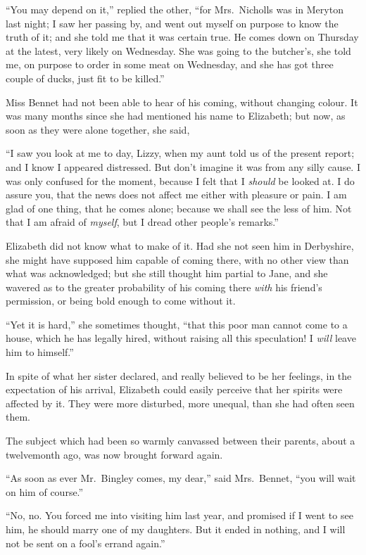 “You may depend on it,” replied the other, “for
Mrs.\ Nich\-olls was in Meryton last night; I saw her
passing by, and went out myself on purpose to know the
truth of it; and she told me that it was certain true.
He comes down on Thursday at the latest, very likely
on Wednesday. She was going to the butcher’s, she told
me, on purpose to order in some meat on Wednesday, and
she has got three couple of ducks, just fit to be killed.”

Miss Bennet had not been able to hear of his coming,
without changing colour. It was many months since she
had mentioned his name to Elizabeth; but now, as soon
as they were alone together, she said,

“I saw you look at me to day, Lizzy, when my aunt
told us of the present report; and I know I appeared
distressed. But don’t imagine it was from any silly cause.
I was only confused for the moment, because I felt that
I \textit{should} be looked at. I do assure you, that the news does
not affect me either with pleasure or pain. I am glad
of one thing, that he comes alone; because we shall see
the less of him. Not that I am afraid of \textit{myself}, but I dread
other people’s remarks.”

Elizabeth did not know what to make of it. Had she
not seen him in Derbyshire, she might have supposed him
capable of coming there, with no other view than what
was acknowledged; but she still thought him partial to
Jane, and she wavered as to the greater probability of
his coming there \textit{with} his friend’s permission, or being bold
enough to come without it.

“Yet it is hard,” she sometimes thought, “that this
poor man cannot come to a house, which he has legally
hired, without raising all this speculation! I \textit{will} leave him
to himself.”

In spite of what her sister declared, and really believed
to be her feelings, in the expectation of his arrival, Elizabeth
could easily perceive that her spirits were affected
by it. They were more disturbed, more unequal, than she
had often seen them.

The subject which had been so warmly canvassed
between their parents, about a twelvemonth ago, was now
brought forward again.

“As soon as ever Mr.\ Bingley comes, my dear,” said
Mrs.\ Bennet, “you will wait on him of course.”

“No, no. You forced me into visiting him last year,
and promised if I went to see him, he should marry one
of my daughters. But it ended in nothing, and I will
not be sent on a fool’s errand again.”

